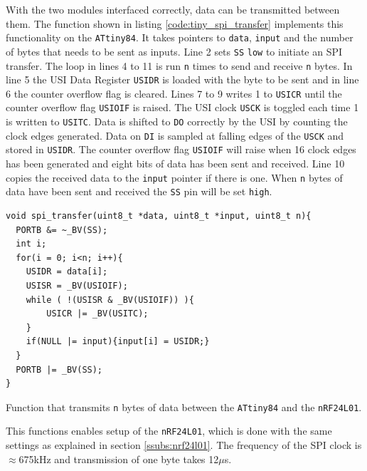 {With the two modules interfaced correctly, data can be transmitted between them.
The function shown in listing \ref{code:tiny_spi_transfer} implements this functionality on the \texttt{ATtiny84}.
It takes pointers to \texttt{data}, \texttt{input} and the number of bytes that needs to be sent as inputs.
Line 2 sets \texttt{SS} \texttt{low} to initiate an SPI transfer.
The loop in lines 4 to 11 is run \texttt{n} times to send and receive \texttt{n} bytes.
In line 5 the USI Data Register \texttt{USIDR} is loaded with the byte to be sent and in line 6 the counter overflow flag is cleared.
Lines 7 to 9 writes 1 to \texttt{USICR} until the counter overflow flag \texttt{USIOIF} is raised.
The USI clock \texttt{USCK} is toggled each time 1 is written to \texttt{USITC}.
Data is shifted to \texttt{DO} correctly by the USI by counting the clock edges generated. 
Data on \texttt{DI} is sampled at falling edges of the \texttt{USCK} and stored in \texttt{USIDR}.
The counter overflow flag \texttt{USIOIF} will raise when 16 clock edges has been generated and eight bits of data has been sent and received.
Line 10 copies the received data to the \texttt{input} pointer if there is one.
When \texttt{n} bytes of data have been sent and received the \texttt{SS} pin will be set \texttt{high}.
\begin{listing}[H] 
\begin{verbatim}
void spi_transfer(uint8_t *data, uint8_t *input, uint8_t n){
  PORTB &= ~_BV(SS);
  int i;
  for(i = 0; i<n; i++){
	USIDR = data[i];
	USISR = _BV(USIOIF);  
	while ( !(USISR & _BV(USIOIF)) ){
		USICR |= _BV(USITC);  
	} 
	if(NULL |= input){input[i] = USIDR;}
  }
  PORTB |= _BV(SS);
}
\end{verbatim}
\caption{Function that transmits \texttt{n} bytes of data between the \texttt{ATtiny84} and the \texttt{nRF24L01}.}
\label{code:tiny_spi_transfer}
\end{listing}

This functions enables setup of the \texttt{nRF24L01}, which is done with the same settings as explained in section \ref{ssubs:nrf24l01}.
The frequency of the SPI clock is $\approx$675kHz and transmission of one byte takes 12$\mu$s.


}
